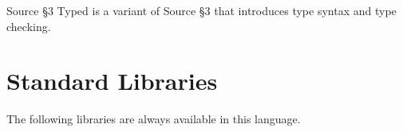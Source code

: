 





Source \S 3 Typed is a variant of Source \S 3 that introduces type syntax and type checking.



























\section{Standard Libraries}

The following libraries are always available in this language.















\newpage



\newpage




